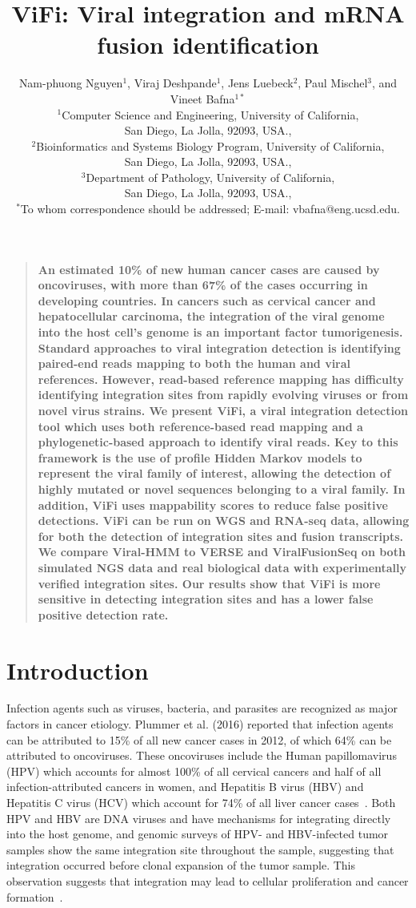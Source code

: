 \documentclass[11pt]{article}
\title{ViFi: Viral integration and mRNA fusion identification}
\author
{Nam-phuong Nguyen$^{1}$, Viraj Deshpande$^{1}$, 
Jens Luebeck$^{2}$, Paul Mischel$^{3}$, and Vineet Bafna$^{1\ast}$\\
\normalsize{$^{1}$Computer Science and Engineering, University of California,}\\
\normalsize{San Diego, La Jolla, 92093, USA.,}\\
\normalsize{$^{2}$Bioinformatics and Systems Biology Program, University of California,}\\
\normalsize{San Diego, La Jolla, 92093, USA.,}\\
\normalsize{$^{3}$Department of Pathology, University of California,}\\
\normalsize{San Diego, La Jolla, 92093, USA.,}\\
\normalsize{$^\ast$To whom correspondence should be addressed; E-mail:  vbafna@eng.ucsd.edu.}
}
\date{}
\newenvironment{sciabstract}{%
\begin{quote} \bf}
{\end{quote}}
\begin{document}
 


\baselineskip24pt


\maketitle 


\begin{sciabstract}
An estimated 10\% of new human cancer cases are caused by oncoviruses, with more than 67\% of the cases occurring in developing countries.  In cancers such as cervical cancer and hepatocellular carcinoma, the integration of the viral genome into the host cell's genome is an important factor tumorigenesis.  Standard approaches to viral integration detection is identifying paired-end reads mapping to both the human and viral references.  However, read-based reference mapping has difficulty identifying integration sites from rapidly evolving viruses or from novel virus strains.  We present ViFi, a viral integration detection tool which uses both reference-based read mapping and a phylogenetic-based approach to identify viral reads.  Key to this framework is the use of profile Hidden Markov models to represent the viral family of interest, allowing the detection of highly mutated or novel  sequences belonging to a viral family.  In addition, ViFi uses mappability scores to reduce false positive detections.  ViFi can be run on WGS and RNA-seq data, allowing for both the detection of integration sites and fusion transcripts.  We compare Viral-HMM to VERSE and ViralFusionSeq on both simulated NGS data and real biological data with experimentally verified integration sites.  Our results show that ViFi is more sensitive in detecting integration sites and has a lower false positive detection rate.
\end{sciabstract}

\section*{Introduction}
Infection agents such as viruses, bacteria, and parasites are recognized as major factors in cancer etiology.  Plummer et al. (2016) reported that infection agents can be attributed to 15\% of all new cancer cases in 2012, of which 64\% can be attributed to oncoviruses.  These oncoviruses include the Human papillomavirus (HPV) which accounts for almost 100\% of all cervical cancers and half of all infection-attributed cancers in women, and Hepatitis B virus (HBV) and Hepatitis C virus (HCV) which account for 74\% of all liver cancer cases~\cite{Plummer2016}.  Both HPV and HBV are DNA viruses and have mechanisms for integrating directly into the host genome, and genomic surveys of HPV- and HBV-infected tumor samples show the same integration site throughout the sample, suggesting that integration occurred before clonal expansion of the tumor sample.  This observation suggests that integration may lead to cellular proliferation and cancer formation~\cite{Moore2010}.
\end{document}
